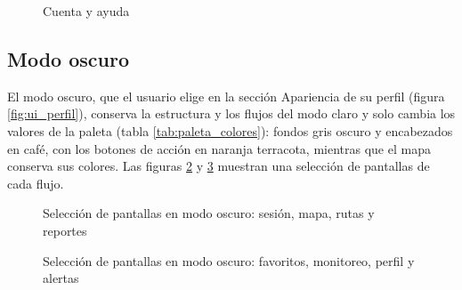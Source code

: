 \begin{figure}[htbp]
    \centering
    \hspace{0.04\linewidth}%
    \hspace{0.04\linewidth}%
    \caption{Cuenta y ayuda}
    \label{fig:ui_perfil_cuenta}
\end{figure}

\subsection{Modo oscuro}
El modo oscuro, que el usuario elige en la sección Apariencia de su perfil (figura \ref{fig:ui_perfil}), conserva la estructura y los flujos del modo claro y solo cambia los valores de la paleta (tabla \ref{tab:paleta_colores}): fondos gris oscuro y encabezados en café, con los botones de acción en naranja terracota, mientras que el mapa conserva sus colores. Las figuras \ref{fig:ui_oscuro_1} y \ref{fig:ui_oscuro_2} muestran una selección de pantallas de cada flujo.

\begin{figure}[htbp]
    \centering
    \hspace{0.04\linewidth}%
    \hspace{0.04\linewidth}%

    \bigskip
    \hspace{0.04\linewidth}%
    \hspace{0.04\linewidth}%
    \caption{Selección de pantallas en modo oscuro: sesión, mapa, rutas y reportes}
    \label{fig:ui_oscuro_1}
\end{figure}

\begin{figure}[htbp]
    \centering
    \hspace{0.04\linewidth}%
    \hspace{0.04\linewidth}%

    \bigskip
    \hspace{0.04\linewidth}%
    \hspace{0.04\linewidth}%
    \caption{Selección de pantallas en modo oscuro: favoritos, monitoreo, perfil y alertas}
    \label{fig:ui_oscuro_2}
\end{figure}
